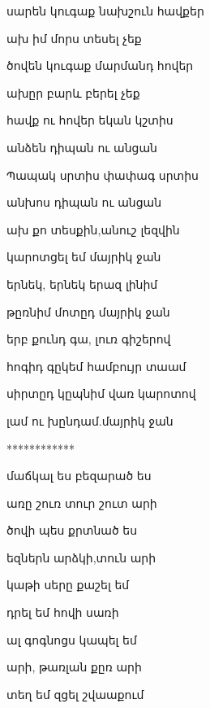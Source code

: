 {                  սարեն  կուգաք նախշուն հավքեր

                   

                   ախ իմ մորս տեսել չեք
         
                  

                  ծովեն կուգաք մարմանդ հովեր


                  ախըր բարև բերել չեք


                  հավք  ու հովեր եկան կշտիս

                  անձեն դիպան  ու  անցան

                  Պապակ սրտիս փափագ սրտիս


                   անխոս դիպան ու անցան
   
                ախ քո տեսքին,անուշ լեզվին          

                 կարոտցել եմ մայրիկ   ջան

                   երնեկ, երնեկ  երազ լինիմ

                  թըռնիմ մոտըդ մայրիկ ջան


                     
                       երբ քունդ գա, լուռ գիշերով


                       հոգիդ գըկեմ համբույր  տաամ


                       սիրտըդ կըպնիմ վառ կարոտով


                       լամ ու խընդամ.մայրիկ ջան


                         
                    \centerline{************} 


                         մաճկալ ես բեզարած  ես

                         առը  շուռ տուր    շուտ արի

                         ծովի պես քրտնած ես


                         եզներն արձկի,տուն արի


                              կաթի սերը քաշել եմ




                              դրել եմ հովի սառի


                              

                            ալ գոգնոցս կապել եմ
                              

                            արի, թառլան քըռ արի


                             տեղ եմ  զցել շվաաքում


}
